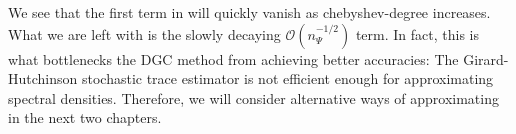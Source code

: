 We see that the first term in  will quickly
vanish as \gls{chebyshev-degree} increases. What we are left with is the slowly
decaying $\mathcal{O}(n_{\Psi}^{-1/2})$ term. In fact, this is what bottlenecks
the \gls{DGC} method from achieving better accuracies: The Girard-Hutchinson stochastic
trace estimator is not efficient enough for approximating spectral densities.
Therefore, we will consider alternative ways of approximating 
in the next two chapters.

